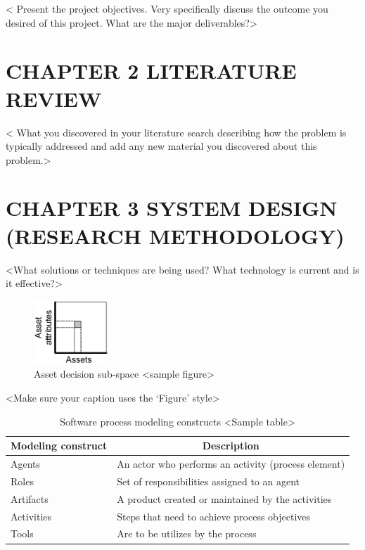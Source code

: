 \documentclass[12pt,openany]{book}
\begin{document}
{\textless} Present the project objectives.  Very specifically discuss the outcome you desired of this project.  What are the major deliverables?{\textgreater}


\chapter[LITERATURE REVIEW]{\hfill CHAPTER 2 \hfill\null\vskip15pt LITERATURE REVIEW}

{\textless} What you discovered in your literature search describing how the problem is typically addressed and add any new material you discovered about this problem.{\textgreater}

\chapter[SYSTEM DESIGN (RESEARCH METHODOLOGY)]{\hfill CHAPTER 3 \hfill\null\vskip15pt SYSTEM DESIGN (RESEARCH METHODOLOGY)}

{\textless}What solutions or techniques are being used?  What technology is current and is it effective?{\textgreater}

\begin{figure}[H]
\centering
\includegraphics[width=0.25\textwidth]{figure1}
\caption{Asset decision sub-space {\textless}sample figure{\textgreater}}\label{fig:1}
\end{figure}
{\textless}Make sure your caption uses the ‘Figure’ style{\textgreater}

\begin{table}[H]
	\centering
	\caption{Software process modeling constructs {\textless}Sample table{\textgreater}}
	\label{tab:01}
	\begin{tabular}{p{}p{}}
		\toprule
		\multicolumn{1}{c}{\textbf{Modeling construct}} & \multicolumn{1}{c}{\textbf{Description}} \\ \midrule
		Agents & An actor who performs an activity (process element) \\
		Roles & Set of responsibilities assigned to an agent \\
		Artifacts & A product created or maintained by the activities \\
		Activities & Steps that need to achieve process objectives \\
		Tools & Are to be utilizes by the process \\ \bottomrule
	\end{tabular}
\end{table}
\end{document}
